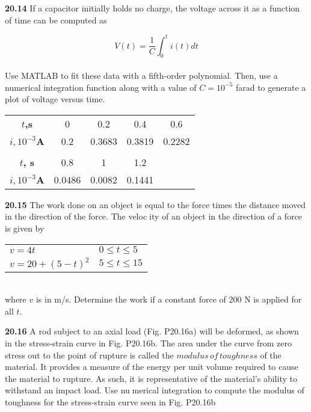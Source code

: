 \begin{multicols}{2}
\textbf{20.14} If a capacitor initially holds no charge, the voltage
across it as a function of time can be computed as 

	$$V(t) = \dfrac{1}{C} \int^{t}_{0} i(t) dt$$\\
Use MATLAB to fit these data with a fifth-order polynomial.
Then, use a numerical integration function along with a value
of $C = 10^{−5}$ farad to generate a plot of voltage versus time.\\
\begin{tabular}{ccccc}
\hline

\textbf{$t$,s} & 0 & 0.2 & 0.4 & 0.6\\

\textbf{$i, 10^{-3}$A} & 0.2 &  0.3683 &  0.3819 &  0.2282\\

\vspace{}\\

\textbf{$t$, s} & 0.8 & 1 & 1.2 & \vspace{}\\

\textbf{$i, 10^{-3}$A} & 0.0486 & 0.0082 & 0.1441 & \vspace{}\\ \hline
\end{tabular}


\textbf{20.15} The work done on an object is equal to the force times
the distance moved in the direction of the force. The velocity of an object in the direction of a force is given by\\
\begin{tabular}{ll}
$v =4t$ & $0 \leq t \leq 5$\\
$v = 20 + (5-t)^{2}$  &  $5 \leq t \leq 15$
\end{tabular}\\
where $v$ is in m/s. Determine the work if a constant force of
200 N is applied for all $t$.

\textbf{20.16} A rod subject to an axial load (Fig. P20.16a) will be
deformed, as shown in the stress-strain curve in Fig. P20.16b. The area under the curve from zero stress out to the point of
rupture is called the $modulus\, of\, toughness$ of the material. It
provides a measure of the energy per unit volume required to
cause the material to rupture. As such, it is representative of
the material’s ability to withstand an impact load. Use numerical integration to compute the modulus of toughness for
the stress-strain curve seen in Fig. P20.16b


\end{multicols}
